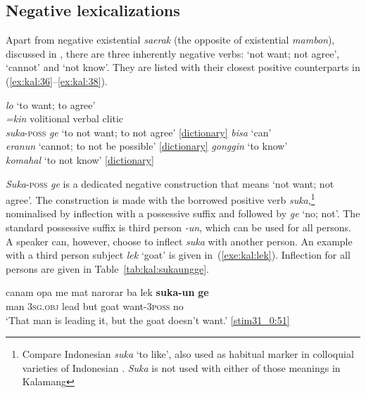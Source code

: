 \documentclass[output=paper,colorlinks,citecolor=brown,draft]{langscibook}
\begin{document}
\subsection{Negative lexicalizations}\label{sec:lexicalneg}
Apart from negative existential \textit{saerak} (the opposite of existential \textit{mambon}), discussed in , there are three inherently negative verbs: `not want; not agree', `cannot' and `not know'. They are listed with their closest positive counterparts in (\ref{ex:kal:36}--\ref{ex:kal:38}).

\ea\label{ex:kal:36}
	\ea \textit{lo} \tab `to want; to agree' \\
	\ex \textit{=kin}  \tab volitional verbal clitic \\
	\ex \textit{suka}-\textsc{poss} \textit{ge}  \tab `to not want; to not agree' {\href{https://doi.org/10.5281/zenodo.4297474}{[dictionary]}}
\z \z
\ea 
	\ea \textit{bisa}  \tab `can' \\
	\ex \textit{eranun}  \tab `cannot; to not be possible' {\href{https://doi.org/10.5281/zenodo.4297474}{[dictionary]}}
\z \z 
\ea\label{ex:kal:38}
	\ea \textit{gonggin}  \tab `to know' \\
	\ex \textit{komahal}  \tab `to not know' {\href{https://doi.org/10.5281/zenodo.4297474}{[dictionary]}}
\z \z


\textit{Suka}-\textsc{poss} \textit{ge} is a dedicated negative construction that means `not want; not agree'. The construction is made with the borrowed positive verb \textit{suka},\footnote{Compare Indonesian \textit{suka} `to like', also used as habitual marker in colloquial varieties of Indonesian \citep{ConnersBrugman2014,Jeoung2020}. \textit{Suka} is not used with either of those meanings in Kalamang} nominalised by inflection with a possessive suffix and followed by \textit{ge} `no; not'. The standard possessive suffix is third person \textit{-un}, which can be used for all persons. A speaker can, however, choose to inflect \textit{suka} with another person. An example with a third person subject \textit{lek} `goat' is given in~(\ref{exe:kal:lek}). Inflection for all persons are given in Table~\ref{tab:kal:sukaungge}.

\ea 	\label{exe:kal:lek}
\gll canam opa me mat narorar ba lek \textbf{suka-un} \textbf{ge}\\
man {\glopa} {\glme} \textsc{3sg.obj} lead but goat want-\textsc{3poss} no\\
\glt `That man is leading it, but the goat doesn't want.' {\href{http://hdl.handle.net/10050/00-0000-0000-0004-1BD1-D}{[stim31\_0:51]}}
\z
\end{document}
